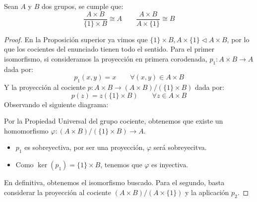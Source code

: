 \begin{prop}
    Sean $A$ y $B$ dos grupos, se cumple que:
    \begin{equation*}
        \dfrac{A\times B}{\{1\}\times B} \cong A \qquad \dfrac{A\times B}{A\times \{1\}} \cong B
    \end{equation*}
    \begin{proof}
        En la Proposición superior ya vimos que $\{1\}\times B, A\times \{1\}\lhd A\times B$, por lo que los cocientes del enunciado tienen todo el sentido. Para el primer isomorfismo, si consideramos la proyección en primera corodenada, $p_1:A\times B\to A$ dada por:
        \begin{equation*}
            p_1(x,y) = x \qquad \forall (x,y)\in A\times B
        \end{equation*}
        Y la proyección al cociente $p:A\times B\to (A\times B)/(\{1\}\times B)$ dada por:
        \begin{equation*}
            p(z) = z(\{1\}\times B) \qquad \forall z\in A\times B
        \end{equation*}
        Observando el siguiente diagrama:
        \begin{figure}[H]
            \centering
        \end{figure}
        Por la Propiedad Universal del grupo cociente, obtenemos que existe un homomorfismo $\varphi:(A\times B)/(\{1\}\times B)\to A$.
        \begin{itemize}
            \item $p_1$ es sobreyectiva, por ser una proyección, $\varphi$ será sobreyecitva.
            \item Como $\ker(p_1) = \{1\}\times B$, tenemos que $\varphi$ es inyectiva.
        \end{itemize}
        En definitiva, obtenemos el isomorfismo buscado. Para el segundo, basta considerar la proyección al cociente $(A\times B)/(A\times \{1\})$ y la aplicación $p_2$.
    \end{proof}
\end{prop}

